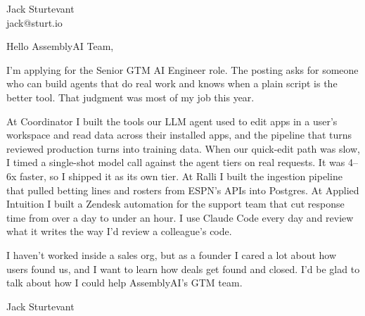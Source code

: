 \documentclass[11pt]{article}
\begin{document}
\raggedright

{\namefont\fontsize{20pt}{24pt}\selectfont Jack Sturtevant}\\[-0.3em]
jack@sturt.io

\vspace{1.2em}

Hello AssemblyAI Team,

I'm applying for the Senior GTM AI Engineer role. The posting asks for someone who can build agents that do real work and knows when a plain script is the better tool. That judgment was most of my job this year.

At Coordinator I built the tools our LLM agent used to edit apps in a user's workspace and read data across their installed apps, and the pipeline that turns reviewed production turns into training data. When our quick-edit path was slow, I timed a single-shot model call against the agent tiers on real requests. It was 4--6x faster, so I shipped it as its own tier. At Ralli I built the ingestion pipeline that pulled betting lines and rosters from ESPN's APIs into Postgres. At Applied Intuition I built a Zendesk automation for the support team that cut response time from over a day to under an hour. I use Claude Code every day and review what it writes the way I'd review a colleague's code.

I haven't worked inside a sales org, but as a founder I cared a lot about how users found us, and I want to learn how deals get found and closed. I'd be glad to talk about how I could help AssemblyAI's GTM team.

\vspace{0.6em}
Jack Sturtevant
\end{document}
